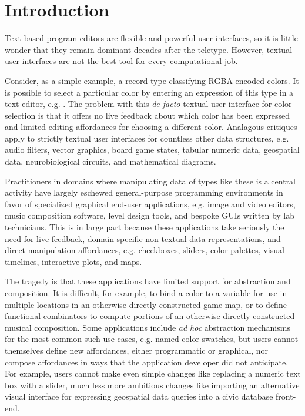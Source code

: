 \section{Introduction}\label{sec:intro}
Text-based program editors are flexible and powerful user interfaces,
so it is little wonder that they remain dominant decades after the teletype.
However, textual user interfaces are not the best tool for every computational job.

Consider, as a simple example, a record type
classifying RGBA-encoded colors.
It is possible to select a particular color by entering
an expression of this type in a text editor, e.g. .
The problem with this \emph{de facto} textual user interface for color selection is that
it offers no live feedback about which color has been expressed
and limited editing affordances for choosing a different color.
Analagous critiques apply to strictly textual user interfaces for
countless other data structures,
e.g. audio filters, 
vector graphics,
board game states,
tabular numeric data,
geospatial data,
neurobiological circuits,
and mathematical diagrams.

Practitioners in domains where manipulating data of types like these is
a central activity
have largely eschewed general-purpose programming environments
in favor of specialized graphical end-user applications, e.g. %
image and video editors, music composition software, level design tools,
and bespoke GUIs written by lab technicians.
This is in large part because these applications
take seriously the need for live feedback, domain-specific
non-textual data representations, and
direct manipulation affordances,
e.g. checkboxes, sliders, color palettes, visual timelines, interactive plots, and maps.

The tragedy is that these applications have
limited support for abstraction and composition.
It is difficult, for example, to bind a
color to a variable for use in multiple locations in an
otherwise directly constructed game map,
or to define functional combinators to compute portions of an
otherwise directly constructed musical composition.
Some applications include \emph{ad hoc} abstraction mechanisms for
the most common such use cases, e.g. named color swatches,
but users cannot themselves define new affordances, either programmatic or graphical,
nor compose
affordances in ways that the application developer did not anticipate.
For example,
users cannot make even simple changes like replacing a
numeric text box with a slider,
much less more ambitious changes like importing an alternative
visual interface for expressing geospatial data queries
into a civic database front-end.

